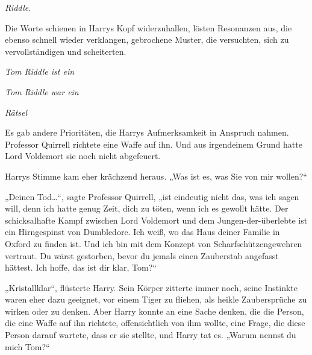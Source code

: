 
 \emph{Riddle}.

\hplettrineextrapara
Die Worte schienen in Harrys Kopf widerzuhallen, lösten Resonanzen aus, die ebenso schnell wieder verklangen, gebrochene Muster, die versuchten, sich zu vervollständigen und scheiterten.

\emph{Tom Riddle ist ein}

\emph{Tom Riddle war ein}

\emph{Rätsel}

Es gab andere Prioritäten, die Harrys Aufmerksamkeit in Anspruch nahmen.
Professor Quirrell richtete eine Waffe auf ihn.
Und aus irgendeinem Grund hatte Lord Voldemort sie noch nicht abgefeuert.

Harrys Stimme kam eher krächzend heraus.
„Was ist es, was Sie von mir wollen?“

„Deinen Tod…“, sagte Professor Quirrell, „ist eindeutig nicht das, was ich sagen will, denn ich hatte genug Zeit, dich zu töten, wenn ich es gewollt hätte. Der schicksalhafte Kampf zwischen Lord Voldemort und dem Jungen-der-überlebte ist ein Hirngespinst von Dumbledore. Ich weiß, wo das Haus deiner Familie in Oxford zu finden ist. Und ich bin mit dem Konzept von Scharfschützengewehren vertraut. Du wärst gestorben, bevor du jemals einen Zauberstab angefasst hättest. Ich hoffe, das ist dir klar, Tom?“

„Kristallklar“, flüsterte Harry.
Sein Körper zitterte immer noch, seine Instinkte waren eher dazu geeignet, vor einem Tiger zu fliehen, als heikle Zaubersprüche zu wirken oder zu denken. Aber Harry konnte an eine Sache denken, die die Person, die eine Waffe auf ihn richtete, offensichtlich von ihm wollte, eine Frage, die diese Person darauf wartete, dass er sie stellte, und Harry tat es.
„Warum nennst du mich Tom?“

